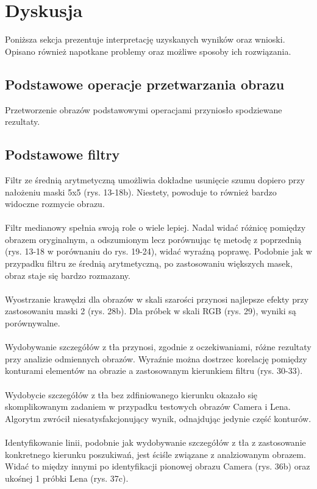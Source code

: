 \documentclass{classrep}
\begin{document}
\section{Dyskusja}
\noindent
Poniższa sekcja prezentuje interpretację uzyskanych wyników oraz wnioski. Opisano również napotkane problemy oraz możliwe sposoby ich rozwiązania.

\subsection{Podstawowe operacje przetwarzania obrazu}
\noindent
Przetworzenie obrazów podstawowymi operacjami przyniosło spodziewane rezultaty. 

\subsection{Podstawowe filtry}
\noindent
Filtr ze średnią arytmetyczną umożliwia dokładne usunięcie szumu dopiero przy nałożeniu maski 5x5 (rys. 13-18b). Niestety, powoduje to również bardzo widoczne rozmycie obrazu.\\
\\
Filtr medianowy spełnia swoją role o wiele lepiej. Nadal widać różnicę pomiędzy obrazem oryginalnym, a odszumionym lecz porównując tę metodę z poprzednią (rys. 13-18 w porównaniu do rys. 19-24), widać wyraźną poprawę. Podobnie jak w przypadku filtru ze średnią arytmetyczną, po zastosowaniu większych masek, obraz staje się bardzo rozmazany.\\
\\
Wyostrzanie krawędzi dla obrazów w skali szarości przynosi najlepsze efekty przy zastosowaniu maski 2 (rys. 28b). Dla próbek w skali RGB (rys. 29), wyniki są porównywalne. \\
\\
Wydobywanie szczegółów z tła przynosi, zgodnie z oczekiwaniami, różne rezultaty przy analizie odmiennych obrazów. Wyraźnie można dostrzec korelację pomiędzy konturami elementów na obrazie a zastosowanym kierunkiem filtru (rys. 30-33).\\
\\
Wydobycie szczegółów z tła bez zdfiniowanego kierunku okazało się skomplikowanym zadaniem w przypadku testowych obrazów Camera i Lena. Algorytm zwrócił niesatysfakcjonujący wynik, odnajdując jedynie część konturów.\\
\\
Identyfikowanie linii, podobnie jak wydobywanie szczegółów z tła z zastosowanie konkretnego kierunku poszukiwań, jest ściśle związane z analziowanym obrazem. Widać to między innymi po identyfikacji pionowej obrazu Camera (rys. 36b) oraz ukośnej 1 próbki Lena (rys. 37c).\\ 
\end{document}
